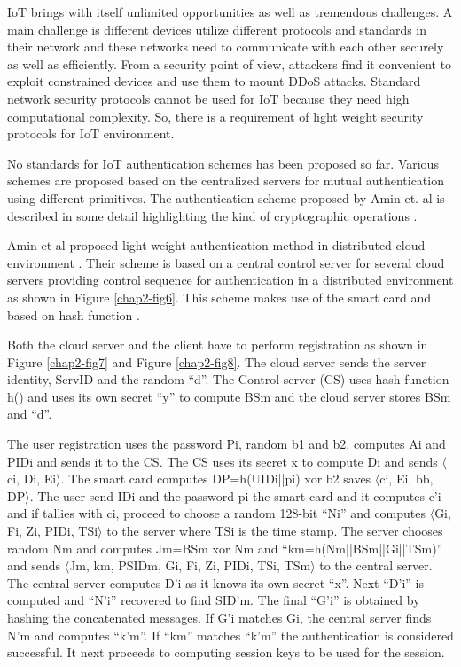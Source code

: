 \begin{multicols}{2}
IoT brings with itself unlimited opportunities as well as tremendous challenges. A main challenge is different devices utilize different protocols and standards in their network and these networks need to communicate with each other securely as well as efficiently. From a security point of view, attackers find it convenient to exploit constrained devices and use them to mount DDoS attacks. Standard network security protocols cannot be used for IoT because they need high computational complexity. So, there is a requirement of light weight security protocols for IoT environment.

No standards for IoT authentication schemes has been proposed so far. Various schemes are proposed based on the centralized servers for mutual authentication using different primitives. The authentication scheme proposed by Amin et. al is described in some detail highlighting the kind of cryptographic operations \cite{chap2-key22}.

Amin et al proposed light weight authentication method in distributed cloud environment \cite{chap2-key19}. Their scheme is based on a central control server for several cloud servers providing control sequence for authentication in a distributed environment as shown in Figure \ref{chap2-fig6}. This scheme makes use of the smart card and based on hash function \cite{chap2-key23}.

Both the cloud server and the client have to perform registration as shown in Figure \ref{chap2-fig7} and Figure \ref{chap2-fig8}. The cloud server sends the server identity, ServID and the random ``d''. The Control server (CS) uses hash function h() and uses its own secret ``y'' to compute BSm and the cloud server stores BSm and ``d''.

The user registration uses the password Pi, random b1 and b2, computes Ai and PIDi and sends it to the CS. The CS uses its secret x to compute Di and sends $\langle$ci, Di, Ei$\rangle$. The smart card computes DP=h(UIDi||pi) xor b2 saves $\langle$ci, Ei, bb, DP$\rangle$. The user send IDi and the password pi the smart card and it computes c'i and if tallies with ci, proceed to choose a random 128-bit ``Ni'' and computes  $\langle$Gi, Fi, Zi, PIDi, TSi$\rangle$ to the server where TSi is the time stamp. The server chooses random Nm and computes Jm=BSm xor Nm and ``km=h(Nm||BSm||Gi||TSm)'' and sends $\langle$Jm, km, PSIDm, Gi, Fi, Zi, PIDi, TSi, TSm$\rangle$ to the central server. The central server computes D'i as it knows its own secret ``x''. Next ``D'i'' is computed and ``N'i'' recovered to find SID'm. The final ``G'i'' is obtained by hashing the concatenated messages. If G'i matches Gi, the central server finds N'm and computes ``k'm''. If ``km'' matches ``k'm'' the authentication is considered successful. It next proceeds to computing session keys to be used for the session.


\end{multicols}
